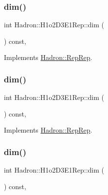 \subsubsection{\texorpdfstring{dim()}{dim()}\hspace{0.1cm}{\footnotesize\ttfamily [3/5]}}
{\footnotesize\ttfamily int Hadron\+::\+H1o2\+D3\+E1\+Rep\+::dim (\begin{DoxyParamCaption}{ }\end{DoxyParamCaption}) const\hspace{0.3cm}{\ttfamily [inline]}, {\ttfamily [virtual]}}



Implements \mbox{\hyperlink{structHadron_1_1RepRep_a92c8802e5ed7afd7da43ccfd5b7cd92b}{Hadron\+::\+Rep\+Rep}}.

\mbox{\label{structHadron_1_1H1o2D3E1Rep_ae38184e966cc90c5d83145072f7f8d9d}} 
\subsubsection{\texorpdfstring{dim()}{dim()}\hspace{0.1cm}{\footnotesize\ttfamily [4/5]}}
{\footnotesize\ttfamily int Hadron\+::\+H1o2\+D3\+E1\+Rep\+::dim (\begin{DoxyParamCaption}{ }\end{DoxyParamCaption}) const\hspace{0.3cm}{\ttfamily [inline]}, {\ttfamily [virtual]}}



Implements \mbox{\hyperlink{structHadron_1_1RepRep_a92c8802e5ed7afd7da43ccfd5b7cd92b}{Hadron\+::\+Rep\+Rep}}.

\mbox{\label{structHadron_1_1H1o2D3E1Rep_ae38184e966cc90c5d83145072f7f8d9d}} 
\subsubsection{\texorpdfstring{dim()}{dim()}\hspace{0.1cm}{\footnotesize\ttfamily [5/5]}}
{\footnotesize\ttfamily int Hadron\+::\+H1o2\+D3\+E1\+Rep\+::dim (\begin{DoxyParamCaption}{ }\end{DoxyParamCaption}) const\hspace{0.3cm}{\ttfamily [inline]}, {\ttfamily [virtual]}}



